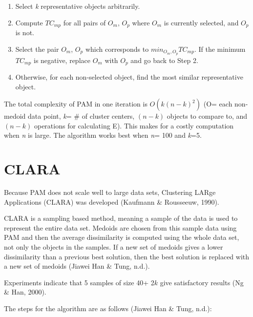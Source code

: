 \documentclass[12pt,twoside]{amherstthesis}
\begin{document}
  \begin{enumerate}
  \def\labelenumi{\arabic{enumi}.}
  \item
    Select \emph{k} representative objects arbitrarily.
  \item
    Compute \(TC_{mp}\) for all pairs of \(O_m\), \(O_p\) where \(O_m\) is
    currently selected, and \(O_p\) is not.
  \item
    Select the pair \(O_m\), \(O_p\) which corresponds to
    \(min_{O_m, O_p} TC_{mp}\). If the minimum \(TC_{mp}\) is negative,
    replace \(O_m\) with \(O_p\) and go back to Step 2.
  \item
    Otherwise, for each non-selected object, find the most similar
    representative object.
  \end{enumerate}
  
  The total complexity of PAM in one iteration is \(O(k(n-k)^2)\) (O= each
  non-medoid data point, \emph{k}= \# of cluster centers, \((n-k)\)
  objects to compare to, and \((n-k)\) operations for calculating E). This
  makes for a costly computation when \emph{n} is large. The algorithm
  works best when \emph{n}= 100 and \emph{k}=5.
  
  \section{CLARA}\label{clara}
  
  Because PAM does not scale well to large data sets, Clustering LARge
  Applications (CLARA) was developed (Kaufmann \& Rousseeuw, 1990).
  
  CLARA is a sampling based method, meaning a sample of the data is used
  to represent the entire data set. Medoids are chosen from this sample
  data using PAM and then the average dissimilarity is computed using the
  whole data set, not only the objects in the samples. If a new set of
  medoids gives a lower dissimilarity than a previous best solution, then
  the best solution is replaced with a new set of medoids (Jiawei Han \&
  Tung, n.d.).
  
  Experiments indicate that 5 samples of size 40+ 2\(k\) give satisfactory
  results (Ng \& Han, 2000).
  
  The steps for the algorithm are as follows (Jiawei Han \& Tung, n.d.):
  
\end{document}
